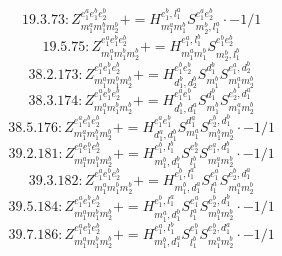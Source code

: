 \documentclass[letterpaper,10pt,fleqn,leqno,onecolumn]{article}
\begin{document}
\begin{equation} \;\;\;\;\;\;  19.3.73: Z^{e_{1}^{a}e_{1}^{b}e_{2}^{b}}_{m_{1}^{a}m_{1}^{b}m_{2}^{b}}+=H^{e_{1}^{b},l_{1}^{a}}_{m_{1}^{a}m_{1}^{b}}S^{e_{1}^{a}e_{2}^{b}}_{m_{2}^{b},l_{1}^{a}}\cdot -1/1 \end{equation}
\begin{equation} \;\;\;\;\;\;  19.5.75: Z^{e_{1}^{a}e_{1}^{b}e_{2}^{b}}_{m_{1}^{a}m_{1}^{b}m_{2}^{b}}+=H^{e_{1}^{a},l_{1}^{b}}_{m_{1}^{a}m_{1}^{b}}S^{e_{1}^{b}e_{2}^{b}}_{m_{2}^{b},l_{1}^{b}} \end{equation}
\begin{equation} \;\;\;\;\;\;  38.2.173: Z^{e_{1}^{a}e_{1}^{b}e_{2}^{b}}_{m_{1}^{a}m_{1}^{b}m_{2}^{b}}+=H^{e_{1}^{b}e_{2}^{b}}_{d_{1}^{b},d_{2}^{b}}S^{d_{1}^{b}}_{m_{1}^{b}}S^{e_{1}^{a},d_{2}^{b}}_{m_{1}^{a}m_{2}^{b}} \end{equation}
\begin{equation} \;\;\;\;\;\;  38.3.174: Z^{e_{1}^{a}e_{1}^{b}e_{2}^{b}}_{m_{1}^{a}m_{1}^{b}m_{2}^{b}}+=H^{e_{1}^{a}e_{1}^{b}}_{d_{1}^{b},d_{1}^{a}}S^{d_{1}^{b}}_{m_{1}^{b}}S^{e_{2}^{b},d_{1}^{a}}_{m_{1}^{a}m_{2}^{b}} \end{equation}
\begin{equation} \;\;\;\;\;\;  38.5.176: Z^{e_{1}^{a}e_{1}^{b}e_{2}^{b}}_{m_{1}^{a}m_{1}^{b}m_{2}^{b}}+=H^{e_{1}^{a}e_{1}^{b}}_{d_{1}^{a},d_{1}^{b}}S^{d_{1}^{a}}_{m_{1}^{a}}S^{e_{2}^{b},d_{1}^{b}}_{m_{1}^{b}m_{2}^{b}}\cdot -1/1 \end{equation}
\begin{equation} \;\;\;\;\;\;  39.2.181: Z^{e_{1}^{a}e_{1}^{b}e_{2}^{b}}_{m_{1}^{a}m_{1}^{b}m_{2}^{b}}+=H^{e_{1}^{b},l_{1}^{b}}_{m_{1}^{b},d_{1}^{b}}S^{e_{2}^{b}}_{l_{1}^{b}}S^{e_{1}^{a},d_{1}^{b}}_{m_{1}^{a}m_{2}^{b}}\cdot -1/1 \end{equation}
\begin{equation} \;\;\;\;\;\;  39.3.182: Z^{e_{1}^{a}e_{1}^{b}e_{2}^{b}}_{m_{1}^{a}m_{1}^{b}m_{2}^{b}}+=H^{e_{1}^{b},l_{1}^{a}}_{m_{1}^{b},d_{1}^{a}}S^{e_{1}^{a}}_{l_{1}^{a}}S^{e_{2}^{b},d_{1}^{a}}_{m_{1}^{a}m_{2}^{b}} \end{equation}
\begin{equation} \;\;\;\;\;\;  39.5.184: Z^{e_{1}^{a}e_{1}^{b}e_{2}^{b}}_{m_{1}^{a}m_{1}^{b}m_{2}^{b}}+=H^{e_{1}^{b},l_{1}^{a}}_{m_{1}^{a},d_{1}^{b}}S^{e_{1}^{a}}_{l_{1}^{a}}S^{e_{2}^{b},d_{1}^{b}}_{m_{1}^{b}m_{2}^{b}}\cdot -1/1 \end{equation}
\begin{equation} \;\;\;\;\;\;  39.7.186: Z^{e_{1}^{a}e_{1}^{b}e_{2}^{b}}_{m_{1}^{a}m_{1}^{b}m_{2}^{b}}+=H^{e_{1}^{a},l_{1}^{b}}_{m_{1}^{b},d_{1}^{a}}S^{e_{1}^{b}}_{l_{1}^{b}}S^{e_{2}^{b},d_{1}^{a}}_{m_{1}^{a}m_{2}^{b}}\cdot -1/1 \end{equation}
\end{document}
